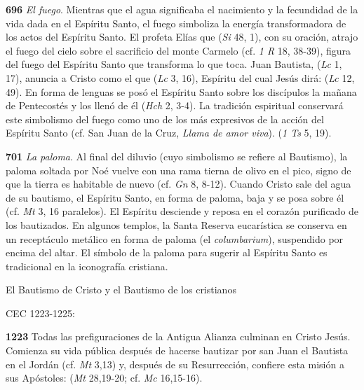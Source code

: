 {\textbf{696} \emph{El fuego}. Mientras que el agua significaba el nacimiento y la fecundidad de la vida dada en el Espíritu Santo, el fuego simboliza la energía transformadora de los actos del Espíritu Santo. El profeta Elías que  (\emph{Si} 48, 1), con su oración, atrajo el fuego del cielo sobre el sacrificio del monte Carmelo (cf. \emph{1 R} 18, 38-39), figura del fuego del Espíritu Santo que transforma lo que toca. Juan Bautista,  (\emph{Lc} 1, 17), anuncia a Cristo como el que  (\emph{Lc} 3, 16), Espíritu del cual Jesús dirá:  (\emph{Lc} 12, 49). En forma de lenguas  se posó el Espíritu Santo sobre los discípulos la mañana de Pentecostés y los llenó de él (\emph{Hch} 2, 3-4). La tradición espiritual conservará este simbolismo del fuego como uno de los más expresivos de la acción del Espíritu Santo (cf. San Juan de la Cruz, \emph{Llama de amor viva}).  (\emph{1 Ts} 5, 19).

\textbf{701} \emph{La paloma}. Al final del diluvio (cuyo simbolismo se refiere al Bautismo), la paloma soltada por Noé vuelve con una rama tierna de olivo en el pico, signo de que la tierra es habitable de nuevo (cf. \emph{Gn} 8, 8-12). Cuando Cristo sale del agua de su bautismo, el Espíritu Santo, en forma de paloma, baja y se posa sobre él (cf. \emph{Mt} 3, 16 paralelos). El Espíritu desciende y reposa en el corazón purificado de los bautizados. En algunos templos, la Santa Reserva eucarística se conserva en un receptáculo metálico en forma de paloma (el \emph{columbarium}), suspendido por encima del altar. El símbolo de la paloma para sugerir al Espíritu Santo es tradicional en la iconografía cristiana.

El Bautismo de Cristo y el Bautismo de los cristianos

CEC 1223-1225:

\textbf{1223} Todas las prefiguraciones de la Antigua Alianza culminan en Cristo Jesús. Comienza su vida pública después de hacerse bautizar por san Juan el Bautista en el Jordán (cf. \emph{Mt} 3,13) y, después de su Resurrección, confiere esta misión a sus Apóstoles:  (\emph{Mt} 28,19-20; cf. \emph{Mc} 16,15-16).

}

